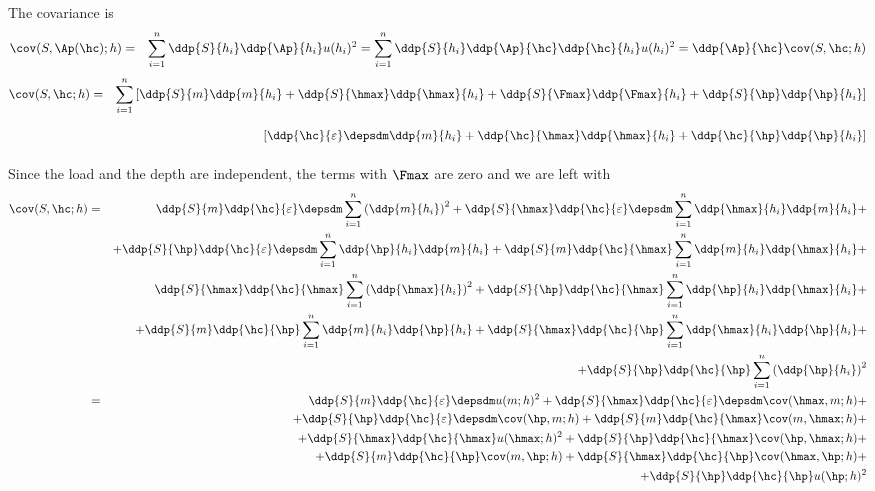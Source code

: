 The covariance is
\begin{eqnarray*}
 \cov(S,\Ap(\hc);h) & =& \sum_{i=1}^n \ddp{ S}{ h_i} \ddp{ \Ap}{ h_i} u(h_i)^2 =  \sum_{i=1}^n \ddp{ S}{ h_i} \ddp{ \Ap}{ \hc} \ddp{\hc}{h_i} u(h_i)^2 = \ddp{\Ap}{\hc} \cov(S,\hc;h)
 \end{eqnarray*}
 \begin{eqnarray*}
\cov(S,\hc;h)  &=& \sum_{i=1}^n
  \left[ 
  \ddp{ S }{ m} \ddp{ m}{ h_i} + 
  \ddp{ S }{ \hmax} \ddp{ \hmax}{ h_i} + 
  \ddp{ S }{ \Fmax} \ddp{ \Fmax}{ h_i} + 
  \ddp{ S }{ \hp} \ddp{ \hp}{ h_i}
  \right]\\
  && \phantom{\sum_{i=1}^n}
  \left[
  \ddp{ \hc }{ \varepsilon} \depsdm \ddp{ m}{ h_i} + 
  \ddp{ \hc }{\hmax} \ddp{ \hmax}{ h_i} + 
  \ddp{ \hc }{ \hp} \ddp{ \hp}{ h_i} 
  \right]
  \end{eqnarray*}
  Since the load and the depth are independent, the terms with $\Fmax$ are zero and we are left with
  \begin{eqnarray*}
  \cov(S,\hc;h) &=& 
  \ddp{ S }{ m} \ddp{ \hc }{ \varepsilon} \depsdm  \sum_{i=1}^n \left(\ddp{ m}{ h_i}\right)^2 +
  \ddp{ S }{ \hmax} \ddp{ \hc }{ \varepsilon} \depsdm  \sum_{i=1}^n \ddp{ \hmax}{ h_i}  \ddp{ m}{ h_i} + \\
  &&+ 
  \ddp{ S }{ \hp} \ddp{ \hc }{ \varepsilon} \depsdm  \sum_{i=1}^n \ddp{ \hp}{ h_i}  \ddp{ m}{ h_i} +
  \ddp{ S }{ m} \ddp{ \hc }{ \hmax}   \sum_{i=1}^n \ddp{ m}{ h_i} \ddp{ \hmax}{ h_i} +  \\
  && 
  \ddp{ S }{ \hmax} \ddp{ \hc }{ \hmax}  \sum_{i=1}^n \left(\ddp{ \hmax}{ h_i} \right)^2 +  
  \ddp{ S }{ \hp} \ddp{ \hc }{ \hmax}  \sum_{i=1}^n \ddp{ \hp}{ h_i}  \ddp{ \hmax}{ h_i} + \\
  &&+
  \ddp{ S }{ m} \ddp{ \hc }{ \hp}   \sum_{i=1}^n \ddp{ m}{ h_i} \ddp{ \hp}{ h_i} +  
  \ddp{ S }{ \hmax} \ddp{ \hc }{ \hp}  \sum_{i=1}^n \ddp{ \hmax}{ h_i}  \ddp{ \hp}{ h_i} + \\
  &&+ 
  \ddp{ S }{ \hp} \ddp{ \hc }{ \hp}  \sum_{i=1}^n \left(\ddp{ \hp}{ h_i}\right)^2  \\
  &=& 
  \ddp{ S }{ m} \ddp{ \hc }{ \varepsilon} \depsdm  u(m;h)^2  +
  \ddp{ S }{ \hmax} \ddp{ \hc }{ \varepsilon} \depsdm  \cov(\hmax,m;h) + \\
  &&+ 
  \ddp{ S }{ \hp} \ddp{ \hc }{ \varepsilon} \depsdm  \cov(\hp, m;h) + 
  \ddp{ S }{ m} \ddp{ \hc }{ \hmax}   \cov(m, \hmax;h) + \\ 
  &&
  + \ddp{ S }{ \hmax} \ddp{ \hc }{ \hmax} u(\hmax;h)^2 + 
  \ddp{ S }{ \hp} \ddp{ \hc }{ \hmax}  \cov(\hp, \hmax;h) + \\
  &&+
  \ddp{ S }{ m} \ddp{ \hc }{ \hp}  \cov(m,\hp;h) +  
  \ddp{ S }{ \hmax} \ddp{ \hc }{ \hp} \cov(\hmax,\hp;h) + \\
  &&+ 
  \ddp{ S }{ \hp} \ddp{ \hc }{ \hp} u(\hp;h)^2  \\ 
  \end{eqnarray*}

